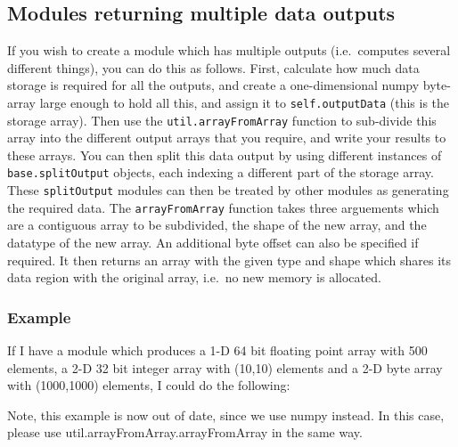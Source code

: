 \documentclass{article}
\begin{document}
\subsection{Modules returning multiple data outputs}
If you wish to create a module which has multiple outputs (i.e.\
computes several different things), you can do this as follows.
First, calculate how much data storage is required for all the
outputs, and create a one-dimensional numpy byte-array large enough
to hold all this, and assign it to \texttt{self.outputData} (this is
the storage array).  Then use
the \texttt{util.arrayFromArray} function to sub-divide this
array into the different output arrays that you require, and write
your results to these arrays.  You can then
split this data output by using different instances of
\texttt{base.splitOutput} objects, each indexing a different part of
the storage array.  These \texttt{splitOutput} modules can then be
treated by other modules as generating the required data.  The
\texttt{arrayFromArray} function takes three arguements which are a
contiguous array to be subdivided, the shape of the new array, and the
datatype of the new array.  An additional byte offset can also be
specified if required.  It then returns an array with the given type
and shape which shares its data region with the original array, i.e.\
no new memory is allocated.

\subsubsection{Example}
If I have a module which produces a 1-D 64 bit floating point array
with 500 elements, a 2-D 32 bit integer array with (10,10) elements
and a 2-D byte array with (1000,1000) elements, I could do the
following:

Note, this example is now out of date, since we use numpy instead.  In
this case, please use util.arrayFromArray.arrayFromArray in the same way.
\end{document}
